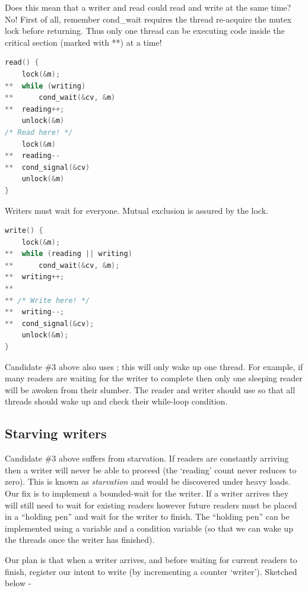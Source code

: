 Does this mean that a writer and read could read and write at the same time? No! First of all, remember cond\_wait requires the thread re-acquire the mutex lock before returning. Thus only one thread can be executing code inside the critical section (marked with **) at a time!

\begin{lstlisting}[language=C]
read() {
    lock(&m);
**  while (writing)
**      cond_wait(&cv, &m)
**  reading++;
    unlock(&m)
/* Read here! */
    lock(&m)
**  reading--
**  cond_signal(&cv)
    unlock(&m)
}
\end{lstlisting}

Writers must wait for everyone. Mutual exclusion is assured by the lock.

\begin{lstlisting}[language=C]
write() {
    lock(&m);
**  while (reading || writing)
**      cond_wait(&cv, &m);
**  writing++;
**
** /* Write here! */
**  writing--;
**  cond_signal(&cv);
    unlock(&m);
}
\end{lstlisting}

Candidate \#3 above also uses  ; this will only wake up one thread. For example, if many readers are waiting for the writer to complete then only one sleeping reader will be awoken from their slumber. The reader and writer should use  so that all threads should wake up and check their while-loop condition.

\subsection{Starving writers}\label{starving-writers}

Candidate \#3 above suffers from starvation. If readers are constantly arriving then a writer will never be able to proceed (the `reading' count never reduces to zero). This is known as \emph{starvation} and would be discovered under heavy loads. Our fix is to implement a bounded-wait for the writer. If a writer arrives they will still need to wait for existing readers however future readers must be placed in a ``holding pen'' and wait for the writer to finish. The ``holding pen'' can be implemented using a variable and a condition variable (so that we can wake up the threads once the writer has finished).

Our plan is that when a writer arrives, and before waiting for current readers to finish, register our intent to write (by incrementing a counter `writer'). Sketched below -

